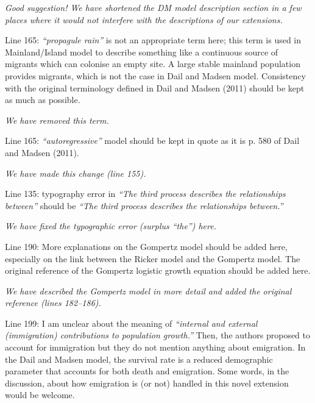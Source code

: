 \documentclass[12pt,english]{article}
\begin{document}
\begin{spacing}{1.9}
\begin{flushleft}
\vspace{0.5cm}
\textit{Good suggestion!  We have shortened the DM model description section in a few places
where it would not interfere with the descriptions of our extensions.}
\vspace{0.5cm}

Line 165: \textit{``propagule rain''} is not an appropriate term here; this term is used in
Mainland/Island model to describe something like a continuous source of migrants which
can colonise an empty site. A large stable mainland population provides migrants, which is
not the case in Dail and Madsen model. Consistency with the original terminology defined in
Dail and Madsen (2011) should be kept as much as possible.

\vspace{0.5cm}
\textit{We have removed this term.}
\vspace{0.5cm}

Line 165: \textit{``autoregressive''} model should be kept in quote as it is p. 580 of Dail and Madsen
(2011).

\vspace{0.5cm}
\textit{We have made this change (line 155).}
\vspace{0.5cm}

Line 135: typography error in \textit{``The third process describes the relationships between''} should
be \textit{``The third process describes the relationships between.''}

\vspace{0.5cm}
\textit{We have fixed the typographic error (surplus ``the'') here.}
\vspace{0.5cm}

Line 190: More explanations on the Gompertz model should be added here, especially on
the link between the Ricker model and the Gompertz model. The original reference of the
Gompertz logistic growth equation should be added here.

\vspace{0.5cm}
\textit{We have described the Gompertz model in more 
detail and added the original reference (lines 182--186).}

\vspace{0.5cm}

Line 199: I am unclear about the meaning of \textit{``internal and external (immigration)
contributions to population growth.''} Then, the authors proposed to account for immigration
but they do not mention anything about emigration. In the Dail and Madsen model, the
survival rate is a reduced demographic parameter that accounts for both death and
emigration. Some words, in the discussion, about how emigration is (or not) handled in this
novel extension would be welcome.


\end{flushleft}
\end{spacing}
\end{document}
